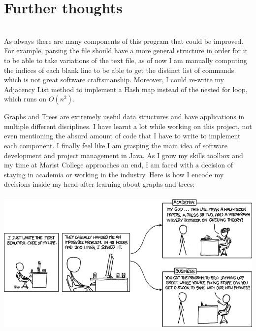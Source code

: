 \documentclass[letterpaper, 10pt]{article}
\begin{document}
\section{Further thoughts}
\\
As always there are many components of this program that could be improved. For example, parsing the file should have a more general structure in order for it to be able to take variations of the text file, as of now I am manually computing the indices of each blank line to be able to get the distinct list of commands which is not great software craftsmanship. Moreover, I could re-write my Adjacency List method to implement a Hash map instead of the nested for loop, which runs on $O(n^2)$. 

Graphs and Trees are extremely useful data structures and have applications in multiple different disciplines. I have learnt a lot while working on this project, not even mentioning the absurd amount of code that I have to write to implement each component. I finally feel like I am grasping the main idea of software development and project management in Java. As I grow my skills toolbox and my time at Marist College approaches an end, I am faced with a decision of staying in academia or working in the industry. Here is how I encode my decisions inside my head after learning about graphs and trees:
\\
\\
\includegraphics[scale=0.45]{images/academia_vs_business.png}
\\
\end{document}
